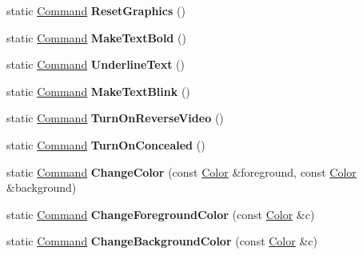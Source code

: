 \begin{DoxyCompactItemize}
\item 
\hypertarget{class_t_c_o_m_1_1_command_acd5d3b1ef2ca590a59c0d9fd80e49947}{static \hyperlink{class_t_c_o_m_1_1_command}{Command} {\bfseries Reset\-Graphics} ()}\label{class_t_c_o_m_1_1_command_acd5d3b1ef2ca590a59c0d9fd80e49947}

\item 
\hypertarget{class_t_c_o_m_1_1_command_a8d20b1dbdd49c62b2dbd216c0145bedb}{static \hyperlink{class_t_c_o_m_1_1_command}{Command} {\bfseries Make\-Text\-Bold} ()}\label{class_t_c_o_m_1_1_command_a8d20b1dbdd49c62b2dbd216c0145bedb}

\item 
\hypertarget{class_t_c_o_m_1_1_command_aa1a5174f5efab153601675fb64d90da6}{static \hyperlink{class_t_c_o_m_1_1_command}{Command} {\bfseries Underline\-Text} ()}\label{class_t_c_o_m_1_1_command_aa1a5174f5efab153601675fb64d90da6}

\item 
\hypertarget{class_t_c_o_m_1_1_command_a8af718aacad6c0cb812e93121c5b29e4}{static \hyperlink{class_t_c_o_m_1_1_command}{Command} {\bfseries Make\-Text\-Blink} ()}\label{class_t_c_o_m_1_1_command_a8af718aacad6c0cb812e93121c5b29e4}

\item 
\hypertarget{class_t_c_o_m_1_1_command_a497dba7160493da248970eec0f3fdcbc}{static \hyperlink{class_t_c_o_m_1_1_command}{Command} {\bfseries Turn\-On\-Reverse\-Video} ()}\label{class_t_c_o_m_1_1_command_a497dba7160493da248970eec0f3fdcbc}

\item 
\hypertarget{class_t_c_o_m_1_1_command_a986c2d8e43f7fd2cbf24e098067ccd14}{static \hyperlink{class_t_c_o_m_1_1_command}{Command} {\bfseries Turn\-On\-Concealed} ()}\label{class_t_c_o_m_1_1_command_a986c2d8e43f7fd2cbf24e098067ccd14}

\item 
\hypertarget{class_t_c_o_m_1_1_command_a10d6f898b13cef813ed6981242d80b06}{static \hyperlink{class_t_c_o_m_1_1_command}{Command} {\bfseries Change\-Color} (const \hyperlink{class_t_c_o_m_1_1_color}{Color} \&foreground, const \hyperlink{class_t_c_o_m_1_1_color}{Color} \&background)}\label{class_t_c_o_m_1_1_command_a10d6f898b13cef813ed6981242d80b06}

\item 
\hypertarget{class_t_c_o_m_1_1_command_a9f436687596f67ff04f6de63c086089c}{static \hyperlink{class_t_c_o_m_1_1_command}{Command} {\bfseries Change\-Foreground\-Color} (const \hyperlink{class_t_c_o_m_1_1_color}{Color} \&c)}\label{class_t_c_o_m_1_1_command_a9f436687596f67ff04f6de63c086089c}

\item 
\hypertarget{class_t_c_o_m_1_1_command_a905fd16d66a54af495ab89bf5f9fea9a}{static \hyperlink{class_t_c_o_m_1_1_command}{Command} {\bfseries Change\-Background\-Color} (const \hyperlink{class_t_c_o_m_1_1_color}{Color} \&c)}\label{class_t_c_o_m_1_1_command_a905fd16d66a54af495ab89bf5f9fea9a}

\end{DoxyCompactItemize}
